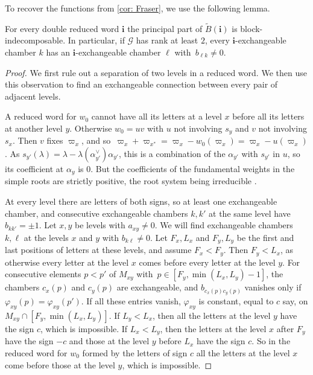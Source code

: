 \documentclass[a4paper]{amsart}
\numberwithin{equation}{section}
\theoremstyle{definition}
\theoremstyle{remark}
\newcommand{\mcG}{\mathcal{G}}
\newcommand{\bfi}{\mathbf{i}}
\newcommand{\tB}{\widetilde{B}}
\begin{document}
To recover the functions from \cref{cor: Fraser}, we use the following lemma.

\begin{lemma}
  \label{lem: BFZ indecomposable}
  For every double reduced word $\bfi$ the principal part of $\tB(\bfi)$ is block-indecomposable.
  In particular, if $\mcG$ has rank at least $2$, every $\bfi$-exchangeable chamber $k$ has an $\bfi$-exchangeable chamber $\ell$ with~$b_{\ell k}\neq0$.
\end{lemma}
\begin{proof}
  We first rule out a separation of two levels in a reduced word.
  We then use this observation to find an exchangeable connection between every pair of adjacent levels.

  A reduced word for $w_0$ cannot have all its letters at a level $x$ before all its letters at another level $y$.
  Otherwise $w_0=uv$ with $u$ not involving $s_y$ and $v$ not involving $s_x$.
  Then $v$ fixes $\varpi_x$, and so~$\varpi_x+\varpi_{x^*}=\varpi_x-w_0(\varpi_x)=\varpi_x-u(\varpi_x)$.
  As $s_{y'}(\lambda)=\lambda-\lambda(\alpha_{y'}^\vee)\alpha_{y'}$, this is a combination of the $\alpha_{y'}$ with $s_{y'}$ in $u$, so its coefficient at $\alpha_y$ is $0$.
  But the coefficients of the fundamental weights in the simple roots are strictly positive, the root system being irreducible \cite[Theorem~4.3 (Fin)]{Kac90}.

  At every level there are letters of both signs, so at least one exchangeable chamber, and consecutive exchangeable chambers $k,k'$ at the same level have $b_{kk'}=\pm1$.
  Let $x,y$ be levels with $a_{xy}\neq0$.
  We will find exchangeable chambers $k,\ell$ at the levels $x$ and $y$ with $b_{k\ell}\neq0$.
  Let $F_x,L_x$ and $F_y,L_y$ be the first and last positions of letters at these levels, and assume $F_x<F_y$.
  Then $F_y<L_x$, as otherwise every letter at the level $x$ comes before every letter at the level $y$.
  For consecutive elements $p<p'$ of $M_{xy}$ with~$p\in[F_y,\min(L_x,L_y)-1]$, the chambers $c_x(p)$ and $c_y(p)$ are exchangeable, and $b_{c_x(p)c_y(p)}$ vanishes only if $\varphi_{xy}(p)=\varphi_{xy}(p')$.
  If all these entries vanish, $\varphi_{xy}$ is constant, equal to $c$ say, on $M_{xy}\cap[F_y,\min(L_x,L_y)]$.
  If $L_y<L_x$, then all the letters at the level $y$ have the sign $c$, which is impossible.
  If $L_x<L_y$, then the letters at the level $x$ after $F_y$ have the sign $-c$ and those at the level $y$ before $L_x$ have the sign $c$.
  So in the reduced word for $w_0$ formed by the letters of sign $c$ all the letters at the level $x$ come before those at the level $y$, which is impossible.
\end{proof}
\end{document}
